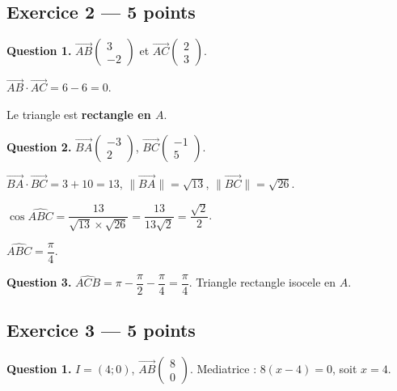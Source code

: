 \subsection*{Exercice 2 — 5 points}


\textbf{Question 1.}
$\overrightarrow{AB}\begin{pmatrix} 3 \\ -2 \end{pmatrix}$ et $\overrightarrow{AC}\begin{pmatrix} 2 \\ 3 \end{pmatrix}$.

$\overrightarrow{AB} \cdot \overrightarrow{AC} = 6 - 6 = 0$.

Le triangle est \textbf{rectangle en $A$}.

\textbf{Question 2.}
$\overrightarrow{BA}\begin{pmatrix} -3 \\ 2 \end{pmatrix}$, $\overrightarrow{BC}\begin{pmatrix} -1 \\ 5 \end{pmatrix}$.

$\overrightarrow{BA} \cdot \overrightarrow{BC} = 3 + 10 = 13$, $\|\overrightarrow{BA}\| = \sqrt{13}$, $\|\overrightarrow{BC}\| = \sqrt{26}$.

$\cos\widehat{ABC} = \dfrac{13}{\sqrt{13} \times \sqrt{26}} = \dfrac{13}{13\sqrt{2}} = \dfrac{\sqrt{2}}{2}$.

$\widehat{ABC} = \dfrac{\pi}{4}$.

\textbf{Question 3.}
$\widehat{ACB} = \pi - \dfrac{\pi}{2} - \dfrac{\pi}{4} = \dfrac{\pi}{4}$. Triangle rectangle isocele en $A$.

\subsection*{Exercice 3 — 5 points}


\textbf{Question 1.}
$I = (4; 0)$, $\overrightarrow{AB}\begin{pmatrix} 8 \\ 0 \end{pmatrix}$. Mediatrice : $8(x - 4) = 0$, soit $x = 4$.

